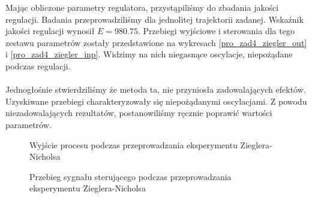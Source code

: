 Mając obliczone parametry regulatora, przystąpiliśmy do zbadania jakości regulacji.
Badania przeprowadziliśmy dla jednolitej trajektorii zadanej.
Wskaźnik jakości regulacji wynosił $E = \num{980.75}$. Przebiegi wyjściowe i 
sterowania dla tego zestawu parametrów zostały przedstawione na wykresach
\ref{pro_zad4_ziegler_out} i \ref{pro_zad4_ziegler_inp}. 
Widzimy na nich niegasnące oscylacje, niepożądane podczas regulacji. \\
\\
\indent Jednogłośnie stwierdziliśmy że metoda ta, nie przyniosła zadowalających 
efektów. Uzyskiwane przebiegi charakteryzowały się niepożądanymi oscylacjami.
Z powodu niezadowalających rezultatów, postanowiliśmy ręcznie poprawić 
wartości parametrów.

\begin{figure}[t]
    \centering
    \caption{Wyjście procesu podczas przeprowadzania eksperymentu Zieglera-Nicholsa}
    \label{pro_zad4_niegasnace_oscylacje_out}
\end{figure}

\begin{figure}[b]
    \centering
    \caption{Przebieg sygnału sterującego podczas przeprowadzania eksperymentu Zieglera-Nicholsa}
    \label{pro_zad4_niegasnace_oscylacje_inp}
\end{figure}


